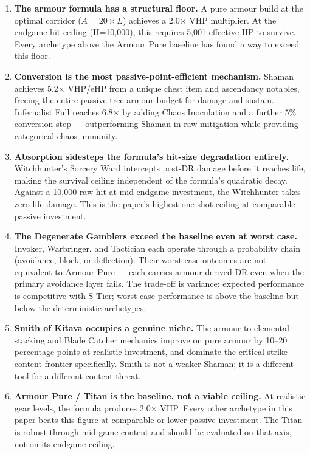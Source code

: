 \documentclass[12pt, letterpaper]{article}
\begin{document}
\begin{enumerate}
    \item \textbf{The armour formula has a structural floor.} A pure armour build at the optimal corridor ($A = 20\times L$) achieves a 2.0$\times$ VHP multiplier. At the endgame hit ceiling (H=10{,}000), this requires 5{,}001 effective HP to survive. Every archetype above the Armour Pure baseline has found a way to exceed this floor.

    \item \textbf{Conversion is the most passive-point-efficient mechanism.} Shaman achieves 5.2$\times$ VHP/eHP from a unique chest item and ascendancy notables, freeing the entire passive tree armour budget for damage and sustain. Infernalist Full reaches 6.8$\times$ by adding Chaos Inoculation and a further 5\% conversion step --- outperforming Shaman in raw mitigation while providing categorical chaos immunity.

    \item \textbf{Absorption sidesteps the formula's hit-size degradation entirely.} Witchhunter's Sorcery Ward intercepts post-DR damage before it reaches life, making the survival ceiling independent of the formula's quadratic decay. Against a 10{,}000 raw hit at mid-endgame investment, the Witchhunter takes zero life damage. This is the paper's highest one-shot ceiling at comparable passive investment.

    \item \textbf{The Degenerate Gamblers exceed the baseline even at worst case.} Invoker, Warbringer, and Tactician each operate through a probability chain (avoidance, block, or deflection). Their worst-case outcomes are not equivalent to Armour Pure --- each carries armour-derived DR even when the primary avoidance layer fails. The trade-off is variance: expected performance is competitive with S-Tier; worst-case performance is above the baseline but below the deterministic archetypes.

    \item \textbf{Smith of Kitava occupies a genuine niche.} The armour-to-elemental stacking and Blade Catcher mechanics improve on pure armour by 10--20 percentage points at realistic investment, and dominate the critical strike content frontier specifically. Smith is not a weaker Shaman; it is a different tool for a different content threat.

    \item \textbf{Armour Pure / Titan is the baseline, not a viable ceiling.} At realistic gear levels, the formula produces 2.0$\times$ VHP. Every other archetype in this paper beats this figure at comparable or lower passive investment. The Titan is robust through mid-game content and should be evaluated on that axis, not on its endgame ceiling.
\end{enumerate}
\end{document}
